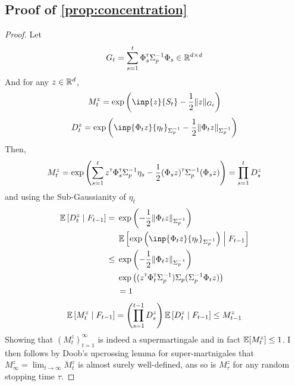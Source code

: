 \documentclass{article}
\begin{document}
\subsection{Proof of \autoref{prop:concentration}}

\begin{proof}


Let 
\begin{equation*}
    G_t = \sum_{s=1}^t \Phi_s^{\mathsf{\scriptscriptstyle T}} \Sigma_p^{-1} \Phi_s \in \mathbb{R}^{d\times d}
\end{equation*}
And for any $z\in\mathbb{R}^d$,
\begin{equation*}
    M_t^z = \exp{\left(\inp{z}{S_t} - \frac{1}{2}\|z\|_{G_t}\right)}
\end{equation*}
\begin{equation*}
    D_t^z = \exp{\left(\inp{\Phi_t z}{\eta_t}_{\Sigma_p^{-1}} - \frac{1}{2}\|\Phi_t z\|_{\Sigma_p^{-1}}\right)}
\end{equation*}
Then,
\begin{align*}
    M_t^z = \exp{\left(\sum_{s=1}^t z^{\mathsf{\scriptscriptstyle T}}\Phi_s^{\mathsf{\scriptscriptstyle T}}\Sigma_p^{-1} \eta_s - \frac{1}{2} (\Phi_s z)^{\mathsf{\scriptscriptstyle T}}\Sigma_p^{-1}(\Phi_s z) \right)} = \prod_{s=1}^{t} D_s^z
\end{align*}
and using the Sub-Gaussianity of $\eta_t$
\begin{align*}
    \expectedvalue\left[D_t^z \condbar F_{t-1}\right] = {}& \exp{\left(- \frac{1}{2}\|\Phi_t z\|_{\Sigma_p^{-1}}\right)}\\ &\expectedvalue\left[\exp{\left(\inp{\Phi_t z}{\eta_t}_{\Sigma_p^{-1}}\right)} \condbar F_{t-1}\right]  \\
    \leq {} & \exp{\left(- \frac{1}{2}\|\Phi_t z\|_{\Sigma_p^{-1}}\right)}\\
    &\exp{\left((z^\transp \Phi_t^\transp \Sigma_p^{-1})\Sigma_p(\Sigma_p^{-1} \Phi_t z)\right)}\\
    &= 1
\end{align*}
\begin{align*}
    \operatorname*{\mathbb{E}}\left[M_t^z \;\middle|\; F_{t-1}\right] = \left(\prod_{s=1}^{t-1} D_s^z\right) \operatorname*{\mathbb{E}}\left[D_t^z \;\middle|\; F_{t-1}\right] \leq M_{t-1}^z
\end{align*}
Showing that $(M_t^z)_{t=1}^\infty$ is indeed a supermartingale and in fact $\operatorname*{\mathbb{E}}[M_t^z]\leq 1$.
I then follows by Doob's upcrossing lemma for super-martnigales that $M_\infty^z = \lim_{t\to\infty} M_t^z$ is almost surely well-defined, ans so is $M_\tau^z$ for any random stopping time $\tau$.


\end{proof}
\end{document}
